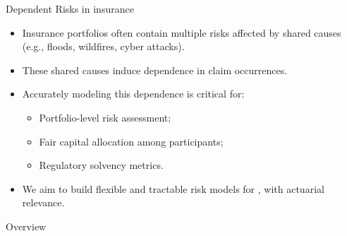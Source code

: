 \documentclass[11pt,xcolor={dvipsnames},hyperref={pdftex,pdfpagemode=UseNone,hidelinks,pdfdisplaydoctitle=true},usepdftitle=false]{beamer}
\begin{document}
\begin{frame}{Dependent Risks in insurance}
\begin{itemize}
    \item Insurance portfolios often contain multiple risks affected by shared causes (e.g., floods, wildfires, cyber attacks).
    
    \item These shared causes induce dependence in claim occurrences.
    
    \item Accurately modeling this dependence is critical for:
    \begin{itemize}
        \item Portfolio-level risk assessment;
        \item Fair capital allocation among participants;
        \item Regulatory solvency metrics.
    \end{itemize}
    
    \item We aim to build flexible and tractable risk models for , with actuarial relevance.
\end{itemize}
\end{frame}

\begin{frame}[label=toc]{Overview}
    \setlength{\leftskip}{5cm}%
    \tableofcontents[subsectionstyle=hide]
\end{frame}


        
\end{document}
